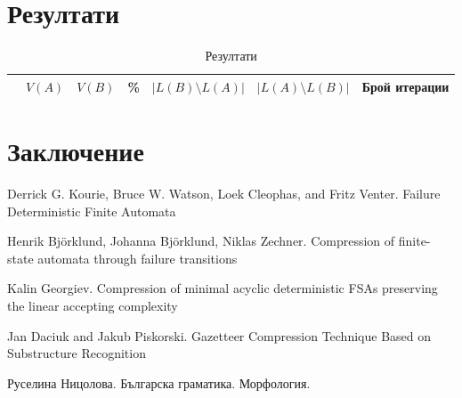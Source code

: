 \documentclass[a4paper,12pt]{article}
\begin{document}
\pagebreak

\section{Резултати}

\begin{center}
  \begin{table}[h]\label{tableResults}
    \centering
    \begin{tabular}{|c||c|c|c|c|c|c|}\hline
            & $V(A)$ & $V(B)$ & \%    & $|L(B) \setminus L(A)|$ & $|L(A) \setminus L(B)|$ & Брой итерации \\\hline
    \end{tabular}
    \caption{Резултати}
  \end{table}
\end{center}

\pagebreak

\section{Заключение}

\pagebreak

\begin{thebibliography}{}

\newblock Derrick G. Kourie, Bruce W. Watson, Loek Cleophas, and Fritz Venter.
\newblock Failure Deterministic Finite Automata

\newblock Henrik Björklund, Johanna Björklund, Niklas Zechner.
\newblock Compression of finite-state automata through failure transitions

\newblock Kalin Georgiev.
\newblock Compression of minimal acyclic deterministic FSAs preserving the linear accepting complexity

\newblock Jan Daciuk and Jakub Piskorski.
\newblock Gazetteer Compression Technique Based on Substructure Recognition

\newblock Руселина Ницолова.
\newblock Българска граматика. Морфология.

\end{thebibliography}
\end{document}
